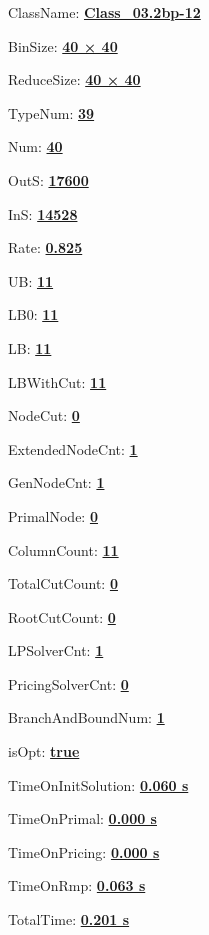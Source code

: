 \documentclass[11pt]{article}
\begin{document}
\pagestyle{empty}


ClassName: \underline{\textbf{Class_03.2bp-12}}
\par
BinSize: \underline{\textbf{40 × 40}}
\par
ReduceSize: \underline{\textbf{40 × 40}}
\par
TypeNum: \underline{\textbf{39}}
\par
Num: \underline{\textbf{40}}
\par
OutS: \underline{\textbf{17600}}
\par
InS: \underline{\textbf{14528}}
\par
Rate: \underline{\textbf{0.825}}
\par
UB: \underline{\textbf{11}}
\par
LB0: \underline{\textbf{11}}
\par
LB: \underline{\textbf{11}}
\par
LBWithCut: \underline{\textbf{11}}
\par
NodeCut: \underline{\textbf{0}}
\par
ExtendedNodeCnt: \underline{\textbf{1}}
\par
GenNodeCnt: \underline{\textbf{1}}
\par
PrimalNode: \underline{\textbf{0}}
\par
ColumnCount: \underline{\textbf{11}}
\par
TotalCutCount: \underline{\textbf{0}}
\par
RootCutCount: \underline{\textbf{0}}
\par
LPSolverCnt: \underline{\textbf{1}}
\par
PricingSolverCnt: \underline{\textbf{0}}
\par
BranchAndBoundNum: \underline{\textbf{1}}
\par
isOpt: \underline{\textbf{true}}
\par
TimeOnInitSolution: \underline{\textbf{0.060 s}}
\par
TimeOnPrimal: \underline{\textbf{0.000 s}}
\par
TimeOnPricing: \underline{\textbf{0.000 s}}
\par
TimeOnRmp: \underline{\textbf{0.063 s}}
\par
TotalTime: \underline{\textbf{0.201 s}}
\par
\newpage


\end{document}
